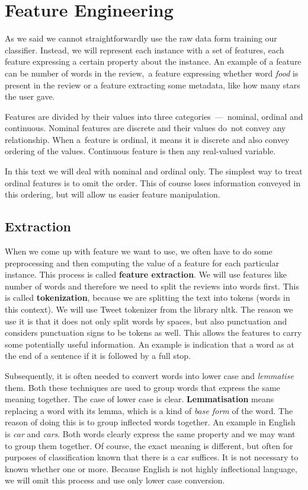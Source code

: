 \chapter{Feature Engineering}
\label{chap:fea}



As we said we cannot straightforwardly use the raw data form training our classifier.
Instead, we will represent each instance with a set of features, each feature expressing a certain property about the instance.
An example of a feature can be number of words in the review,\
a feature expressing whether word {\it food} is present in the review
or a feature extracting some metadata, like how many stars the user gave.

Features are divided by their values into three categories~---~nominal, ordinal and continuous. Nominal features are discrete and their values do~not convey any relationship. When a~feature is ordinal, it means it is discrete and also convey ordering of the values. Continuous feature is then any real-valued variable.

In this text we will deal with nominal and ordinal only. The simplest way to treat ordinal features is to omit the order. This of course loses information conveyed in this ordering, but will allow us easier feature manipulation.

\section{Extraction}

When we come up with feature we want to use, we often have to do some preprocessing and then computing the value of a feature for each particular instance.
This process is called {\bf feature extraction}.
We will use features like number of words and therefore we need to split the reviews into words first.
This is called {\bf tokenization}, because we are splitting the text into tokens (words in this context).
We will use Tweet tokenizer from the library nltk.
The reason we use it is that it does not only split words by spaces,
but also punctuation and considers punctuation signs to be tokens as well.
This allows the features to carry some potentially useful information.
An example is indication that a word as at the end of a sentence if it is followed by a full stop.

Subsequently, it is often needed to convert words into lower case and {\it lemmatise} them.
Both these techniques are used to group words that express the same meaning together.
The case of lower case is clear.
{\bf Lemmatisation} means replacing a word with its lemma, which is a kind of {\it base form} of the word.
The reason of doing this is to group inflected words together.
An example in English is {\it car} and {\it cars}.
Both words clearly express the same property and we may want to group them together.
Of course, the exact meaning is different, but often for purposes of classification known that there is a car
suffices. It is not necessary to known whether one or more.
Because English is not highly inflectional language, we will omit this process and use only lower case conversion.


